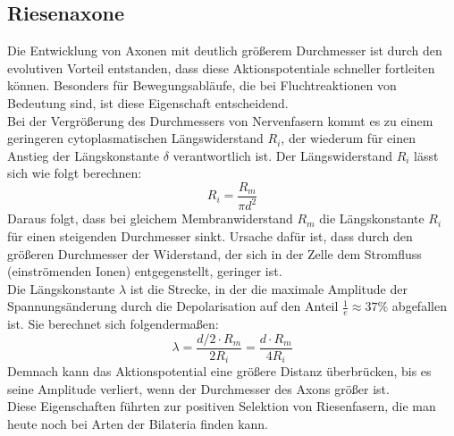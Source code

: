 \documentclass[11pt]{article}
\begin{document}
\subsection{Riesenaxone}
Die Entwicklung von Axonen mit deutlich größerem Durchmesser ist durch den evolutiven Vorteil entstanden, dass diese Aktionspotentiale schneller fortleiten können. Besonders für Bewegungsabläufe, die bei Fluchtreaktionen von Bedeutung sind, ist diese Eigenschaft entscheidend. \\
Bei der Vergrößerung des Durchmessers von Nervenfasern kommt es zu einem geringeren cytoplasmatischen Längswiderstand $R_i$, der wiederum für einen Anstieg der Längskonstante $\delta$ verantwortlich ist. Der Längswiderstand $R_i$ lässt sich wie folgt berechnen:
\begin{equation}
\label{eq1}
R_i = \dfrac{R_m}{\pi d^2}
\end{equation}
Daraus folgt, dass bei gleichem Membranwiderstand $R_m$ die Längskonstante $R_i$ für einen steigenden Durchmesser sinkt. Ursache dafür ist, dass durch den größeren Durchmesser der Widerstand, der sich in der Zelle dem Stromfluss (einströmenden Ionen) entgegenstellt, geringer ist. \\
Die Längskonstante $\lambda$ ist die Strecke, in der die maximale Amplitude der Spannungsänderung durch die Depolarisation auf den Anteil $\frac{1}{e} \approx 37\%$ abgefallen ist.  \cite{physiologie} Sie berechnet sich folgendermaßen:
\begin{equation}
\label{eq2}
\lambda = \dfrac{d/2 \cdot R_m}{2 R_i} = \dfrac{d \cdot R_m}{4 R_i}
\end{equation}
Demnach kann das Aktionspotential eine größere Distanz überbrücken, bis es seine Amplitude verliert, wenn der Durchmesser des Axons größer ist. \\
Diese Eigenschaften führten zur positiven Selektion von Riesenfasern, die man heute noch bei Arten der Bilateria finden kann. 
\end{document}
